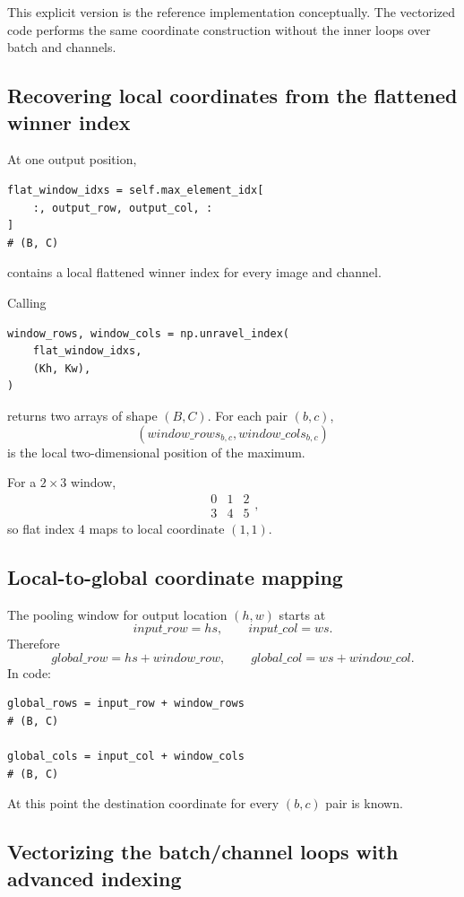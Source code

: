 \documentclass[11pt,a4paper]{article}
\begin{document}
This explicit version is the reference implementation conceptually. The vectorized code performs the same coordinate construction without the inner loops over batch and channels.

\subsection{Recovering local coordinates from the flattened winner index}

At one output position,
\begin{lstlisting}
flat_window_idxs = self.max_element_idx[
    :, output_row, output_col, :
]
# (B, C)
\end{lstlisting}
contains a local flattened winner index for every image and channel.

Calling
\begin{lstlisting}
window_rows, window_cols = np.unravel_index(
    flat_window_idxs,
    (Kh, Kw),
)
\end{lstlisting}
returns two arrays of shape $(B,C)$. For each pair $(b,c)$,
\[
(window\_rows_{b,c},window\_cols_{b,c})
\]
is the local two-dimensional position of the maximum.

For a $2\times3$ window,
\[
\begin{matrix}
0&1&2\\
3&4&5
\end{matrix},
\]
so flat index $4$ maps to local coordinate $(1,1)$.

\subsection{Local-to-global coordinate mapping}

The pooling window for output location $(h,w)$ starts at
\[
input\_row=hs,
\qquad
input\_col=ws.
\]
Therefore
\[
\boxed{
global\_row=hs+window\_row,
\qquad
global\_col=ws+window\_col
}.
\]
In code:
\begin{lstlisting}
global_rows = input_row + window_rows
# (B, C)

global_cols = input_col + window_cols
# (B, C)
\end{lstlisting}

At this point the destination coordinate for every $(b,c)$ pair is known.

\subsection{Vectorizing the batch/channel loops with advanced indexing}
\end{document}
